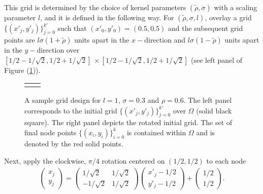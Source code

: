 This grid is determined by the choice of kernel parameters
$(\tilde{\rho}, \sigma)$ with a scaling parameter $l$, and it is
defined in the following way. For $(\tilde{\rho}, \sigma, l)$, overlay
a grid $\{ (x'_j, y'_j) \}_{j=0}^{k'}$ such that
$(x'_0, y'_0) = (0.5,0.5)$ and the subsequent grid points are
$l\sigma(1 + \tilde{\rho})$ units apart in the $x-$direction and
$l\sigma(1 - \tilde{\rho})$ units apart in the $y-$direction over
$[1/2 - 1/\sqrt{2}, 1/2 + 1/\sqrt{2}] \, \times [1/2 - 1/\sqrt{2}, 1/2
+ 1/\sqrt{2}]$ (see left panel of Figure (\ref{fig:grids})).
\begin{figure}
  \centering
  \begin{tabular}{cc}
    \begin{minipage}{0.4\textwidth}
      \centering
    \end{minipage}
    & \begin{minipage}{0.4\textwidth}
      \centering
    \end{minipage}
  \end{tabular}
  \caption{A sample grid design for $l=1$, $\sigma=0.3$ and $\rho=0.6$. The
    left panel corresponds to the initial grid
    $\{ (x'_j,y'_j) \}_{j=0}^{k'}$ over $\Omega$ (solid black
    square). The right panel depicts the rotated initial grid. The set
    of final node points $\{ (x_i,y_i) \}_{i=0}^{k}$ is contained
    within $\Omega$ and is denoted by the red solid points.}
  \label{fig:grids}
\end{figure}
Next, apply the clockwise, $\pi/4$ rotation centered on
$(1/2, 1/2)$ to each node
\begin{align*}
  \left( \begin{array}{c}
           x_j \\
           y_j
         \end{array} \right) =
       \left( \begin{array}{cc}
                1/\sqrt{2} & 1/\sqrt{2} \\
                -1/\sqrt{2} & 1/\sqrt{2}
              \end{array} \right) 
            \left( \begin{array}{c}
                     x'_j - 1/2\\
                     y'_j -1/2
                   \end{array} \right) +
  \left( \begin{array}{c}
           1/2 \\ 1/2
           \end{array} \right).
\end{align*}
